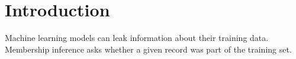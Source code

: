\section{Introduction}
Machine learning models can leak information about their training data.
Membership inference asks whether a given record was part of the training set.
